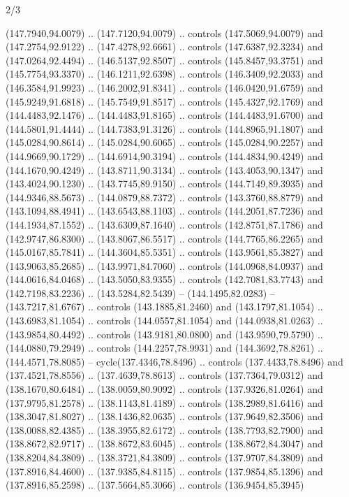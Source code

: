 \begin{flagdescription}{2/3}
\begin{scope}[xshift=0.5\flaglength,yshift=0.5\flagwidth,scale=\flagwidth/180]
\begin{scope}[y=0.8pt, x=0.8pt, yscale=-1,shift={(-168.75,-108.75)}]
  (147.7940,94.0079) .. (147.7120,94.0079) .. controls (147.5069,94.0079) and
  (147.2754,92.9122) .. (147.4278,92.6661) .. controls (147.6387,92.3234) and
  (147.0264,92.4494) .. (146.5137,92.8507) .. controls (145.8457,93.3751) and
  (145.7754,93.3370) .. (146.1211,92.6398) .. controls (146.3409,92.2033) and
  (146.3584,91.9923) .. (146.2002,91.8341) .. controls (146.0420,91.6759) and
  (145.9249,91.6818) .. (145.7549,91.8517) .. controls (145.4327,92.1769) and
  (144.4483,92.1476) .. (144.4483,91.8165) .. controls (144.4483,91.6700) and
  (144.5801,91.4444) .. (144.7383,91.3126) .. controls (144.8965,91.1807) and
  (145.0284,90.8614) .. (145.0284,90.6065) .. controls (145.0284,90.2257) and
  (144.9669,90.1729) .. (144.6914,90.3194) .. controls (144.4834,90.4249) and
  (144.1670,90.4249) .. (143.8711,90.3134) .. controls (143.4053,90.1347) and
  (143.4024,90.1230) .. (143.7745,89.9150) .. controls (144.7149,89.3935) and
  (144.9346,88.5673) .. (144.0879,88.7372) .. controls (143.3760,88.8779) and
  (143.1094,88.4941) .. (143.6543,88.1103) .. controls (144.2051,87.7236) and
  (144.1934,87.1552) .. (143.6309,87.1640) .. controls (142.8751,87.1786) and
  (142.9747,86.8300) .. (143.8067,86.5517) .. controls (144.7765,86.2265) and
  (145.0167,85.7841) .. (144.3604,85.5351) .. controls (143.9561,85.3827) and
  (143.9063,85.2685) .. (143.9971,84.7060) .. controls (144.0968,84.0937) and
  (144.0616,84.0468) .. (143.5050,83.9355) .. controls (142.7081,83.7743) and
  (142.7198,83.2236) .. (143.5284,82.5439) -- (144.1495,82.0283) --
  (143.7217,81.6767) .. controls (143.1885,81.2460) and (143.1797,81.1054) ..
  (143.6983,81.1054) .. controls (144.0557,81.1054) and (144.0938,81.0263) ..
  (143.9854,80.4492) .. controls (143.9181,80.0800) and (143.9590,79.5790) ..
  (144.0880,79.2949) .. controls (144.2257,78.9931) and (144.3692,78.8261) ..
  (144.4571,78.8085) -- cycle(137.4346,78.8496) .. controls (137.4433,78.8496)
  and (137.4521,78.8556) .. (137.4639,78.8613) .. controls (137.7364,79.0312)
  and (138.1670,80.6484) .. (138.0059,80.9092) .. controls (137.9326,81.0264)
  and (137.9795,81.2578) .. (138.1143,81.4189) .. controls (138.2989,81.6416)
  and (138.3047,81.8027) .. (138.1436,82.0635) .. controls (137.9649,82.3506)
  and (138.0088,82.4385) .. (138.3955,82.6172) .. controls (138.7793,82.7900)
  and (138.8672,82.9717) .. (138.8672,83.6045) .. controls (138.8672,84.3047)
  and (138.8204,84.3809) .. (138.3721,84.3809) .. controls (137.9707,84.3809)
  and (137.8916,84.4600) .. (137.9385,84.8115) .. controls (137.9854,85.1396)
  and (137.8916,85.2598) .. (137.5664,85.3066) .. controls (136.9454,85.3945)

\end{scope}
\end{scope}
\end{flagdescription}
